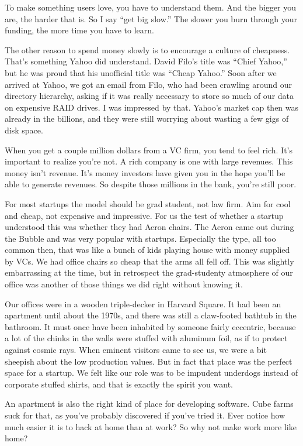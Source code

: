 \documentclass[12pt]{book}
\begin{document}
To make something users love, you have to understand them. And the
bigger you are, the harder that is. So I say ``get big slow.'' The
slower you burn through your funding, the more time you have to learn.

The other reason to spend money slowly is to encourage a culture of
cheapness. That's something Yahoo did understand. David Filo's title was
``Chief Yahoo,'' but he was proud that his unofficial title was ``Cheap
Yahoo.'' Soon after we arrived at Yahoo, we got an email from Filo, who
had been crawling around our directory hierarchy, asking if it was
really necessary to store so much of our data on expensive RAID drives.
I was impressed by that. Yahoo's market cap then was already in the
billions, and they were still worrying about wasting a few gigs of disk
space.

When you get a couple million dollars from a VC firm, you tend to feel
rich. It's important to realize you're not. A rich company is one with
large revenues. This money isn't revenue. It's money investors have
given you in the hope you'll be able to generate revenues. So despite
those millions in the bank, you're still poor.

For most startups the model should be grad student, not law firm. Aim
for cool and cheap, not expensive and impressive. For us the test of
whether a startup understood this was whether they had Aeron chairs. The
Aeron came out during the Bubble and was very popular with startups.
Especially the type, all too common then, that was like a bunch of kids
playing house with money supplied by VCs. We had office chairs so cheap
that the arms all fell off. This was slightly embarrassing at the time,
but in retrospect the grad-studenty atmosphere of our office was another
of those things we did right without knowing it.

Our offices were in a wooden triple-decker in Harvard Square. It had
been an apartment until about the 1970s, and there was still a
claw-footed bathtub in the bathroom. It must once have been inhabited by
someone fairly eccentric, because a lot of the chinks in the walls were
stuffed with aluminum foil, as if to protect against cosmic rays. When
eminent visitors came to see us, we were a bit sheepish about the low
production values. But in fact that place was the perfect space for a
startup. We felt like our role was to be impudent underdogs instead of
corporate stuffed shirts, and that is exactly the spirit you want.

An apartment is also the right kind of place for developing software.
Cube farms suck for that, as you've probably discovered if you've tried
it. Ever notice how much easier it is to hack at home than at work? So
why not make work more like home?
\end{document}
